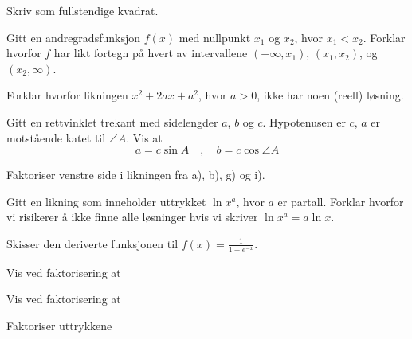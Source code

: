 \documentclass[english,oneside, hidelinks, 11 pt, class=report,crop=false]{standalone}
\begin{document}
Skriv som fullstendige kvadrat. \os
{}

Gitt en andregradsfunksjon $f(x)$ med nullpunkt $x_1$ og $x_2$, hvor $x_1<x_2$. Forklar hvorfor $f$ har likt fortegn på hvert av intervallene $(-\infty, x_1)$, $(x_1, x_2)$, og $(x_2, \infty)$.

Forklar hvorfor likningen $x^2+2ax+a^2$, hvor $a>0$, ikke har noen (reell) løsning.

Gitt en rettvinklet trekant med sidelengder $a$, $b$ og $c$.  Hypotenusen er $c$, $a$ er motstående katet til $\angle A$. Vis at
\[ a=c\sin A \quad,\quad b=c\cos \angle A \]

Faktoriser venstre side i likningen fra  a), b), g) og i).

Gitt en likning som inneholder uttrykket $\ln x^a$, hvor $a$ er partall. Forklar hvorfor vi risikerer å ikke finne alle løsninger hvis vi skriver $\ln x^a=a\ln x$.

Skisser den deriverte funksjonen til $f(x)=\frac{1}{1+e^{-x}}$.


	

Vis ved faktorisering at

Vis ved faktorisering at

Faktoriser uttrykkene \os
{}
\end{document}

